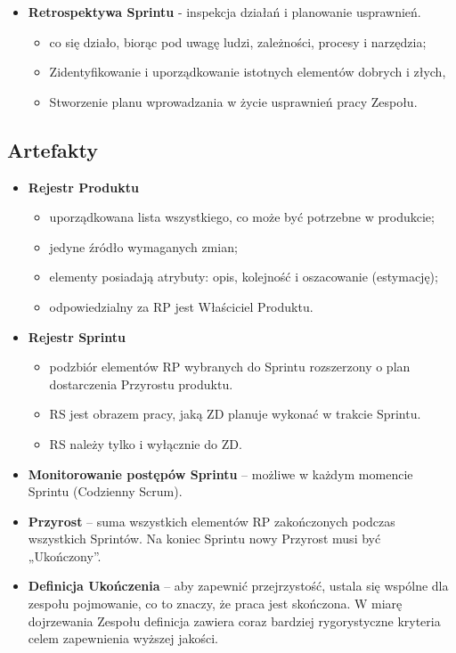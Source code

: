 \documentclass[main.tex]{subfiles}
\begin{document}
\begin{itemize}
        \item \textbf{Retrospektywa Sprintu} - inspekcja działań i planowanie usprawnień.
        \begin{itemize}[noitemsep]
            \item co się działo, biorąc pod uwagę ludzi, zależności, procesy i narzędzia;
            \item Zidentyfikowanie i uporządkowanie istotnych elementów dobrych i złych,
            \item Stworzenie planu wprowadzania w życie usprawnień pracy Zespołu.
        \end{itemize}
    \end{itemize}

    \subsection{Artefakty}
    \begin{itemize}
        \item \textbf{Rejestr Produktu}
        \begin{itemize}[noitemsep]
            \item uporządkowana lista wszystkiego, co może być potrzebne w produkcie;
            \item jedyne źródło wymaganych zmian;
            \item elementy posiadają atrybuty: opis, kolejność i oszacowanie (estymację);
            \item odpowiedzialny za RP jest Właściciel Produktu.
        \end{itemize}

        \item \textbf{Rejestr Sprintu}
        \begin{itemize}[noitemsep]
            \item podzbiór elementów RP wybranych do Sprintu rozszerzony o plan dostarczenia Przyrostu produktu.
            \item RS jest obrazem pracy, jaką ZD planuje wykonać w trakcie Sprintu.
            \item RS należy tylko i wyłącznie do ZD.
        \end{itemize}

        \item \textbf{Monitorowanie postępów Sprintu} -- możliwe w każdym momencie Sprintu (Codzienny Scrum).

        \item \textbf{Przyrost} -- suma wszystkich elementów RP zakończonych podczas wszystkich Sprintów.
        Na koniec Sprintu nowy Przyrost musi być „Ukończony”.

        \item \textbf{Definicja Ukończenia} -- aby zapewnić przejrzystość, ustala się wspólne dla zespołu
        pojmowanie, co to znaczy, że praca jest skończona. W miarę dojrzewania Zespołu definicja zawiera coraz bardziej
        rygorystyczne kryteria celem zapewnienia wyższej jakości.
    \end{itemize}
\end{document}
